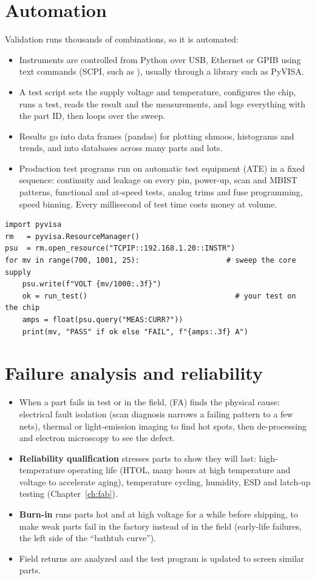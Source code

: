 \section{Automation}

Validation runs thousands of combinations, so it is automated:
\begin{itemize}
  \item Instruments are controlled from Python over USB, Ethernet or GPIB using text commands (SCPI, such as ), usually through a library such as PyVISA.
  \item A test script sets the supply voltage and temperature, configures the chip, runs a test, reads the result and the measurements, and logs everything with the part ID, then loops over the sweep.
  \item Results go into data frames (pandas) for plotting shmoos, histograms and trends, and into databases across many parts and lots.
  \item Production test programs run on automatic test equipment (ATE) in a fixed sequence: continuity and leakage on every pin, power-up, scan and MBIST patterns, functional and at-speed tests, analog trims and fuse programming, speed binning. Every millisecond of test time costs money at volume.
\end{itemize}

\begin{lstlisting}
import pyvisa
rm   = pyvisa.ResourceManager()
psu  = rm.open_resource("TCPIP::192.168.1.20::INSTR")
for mv in range(700, 1001, 25):                    # sweep the core supply
    psu.write(f"VOLT {mv/1000:.3f}")
    ok = run_test()                                  # your test on the chip
    amps = float(psu.query("MEAS:CURR?"))
    print(mv, "PASS" if ok else "FAIL", f"{amps:.3f} A")
\end{lstlisting}

\section{Failure analysis and reliability}

\begin{itemize}
  \item When a part fails in test or in the field,  (FA) finds the physical cause: electrical fault isolation (scan diagnosis narrows a failing pattern to a few nets), thermal or light-emission imaging to find hot spots, then de-processing and electron microscopy to see the defect.
  \item \textbf{Reliability qualification} stresses parts to show they will last: high-temperature operating life (HTOL, many hours at high temperature and voltage to accelerate aging), temperature cycling, humidity, ESD and latch-up testing (Chapter~\ref{ch:fab}).
  \item \textbf{Burn-in} runs parts hot and at high voltage for a while before shipping, to make weak parts fail in the factory instead of in the field (early-life failures, the left side of the ``bathtub curve'').
  \item Field returns are analyzed and the test program is updated to screen similar parts.
\end{itemize}

